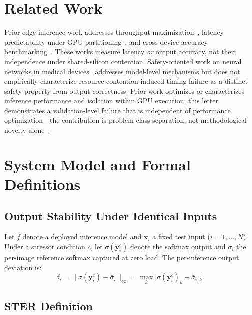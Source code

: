 \documentclass[journal,10pt,twocolumn]{IEEEtran}
\begin{document}
\section{Related Work}

Prior edge inference work addresses throughput maximization~\cite{hao2023},
latency predictability under GPU partitioning~\cite{martin2026}, and
cross-device accuracy benchmarking~\cite{baller2021,tobiasz2023}.
These works measure latency \emph{or} output accuracy, not their
independence under shared-silicon contention.
Safety-oriented work on neural networks in medical devices~\cite{becker2019}
addresses model-level mechanisms but does not empirically characterize
resource-contention-induced timing failure as a distinct safety property
from output correctness.
Prior work optimizes or characterizes inference performance and isolation
within GPU execution; this letter demonstrates a validation-level failure
that is independent of performance optimization---the contribution is
problem class separation, not methodological novelty alone~\cite{martin2026}.

\section{System Model and Formal Definitions}

\subsection{Output Stability Under Identical Inputs}

Let $f$ denote a deployed inference model and $\mathbf{x}_i$ a fixed
test input ($i = 1,\ldots,N$).
Under a stressor condition $c$, let $\sigma(\mathbf{y}_i^c)$ denote the
softmax output and $\bar{\sigma}_i$ the per-image reference softmax
captured at zero load.
The per-inference output deviation is:
\begin{equation}
  \delta_i = \bigl\|\sigma(\mathbf{y}_i^c) - \bar{\sigma}_i\bigr\|_\infty
           = \max_k \bigl|\sigma(\mathbf{y}_i^c)_k - \bar{\sigma}_{i,k}\bigr|
  \label{eq:delta}
\end{equation}

\subsection{STER Definition}
\end{document}
